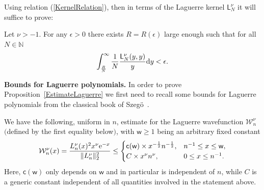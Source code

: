 Using relation (\ref{KernelRelation}), then in terms of the Laguerre kernel $\mathsf{L}_N^{\nu}$ it will suffice to prove:

\begin{Proposition}\label{EstimateLaguerre}
Let $\nu>-1$. For any $\epsilon>0$ there exists $R=R(\epsilon)$ large enough such that for all $N \in \mathbb{N}$
\begin{gather*}
\int_{\frac{R}{N}}^{\infty}\frac{1}{N}\frac{\mathsf{L}_N^{\nu}(y,y)}{y}{\rm d}y<\epsilon.
\end{gather*}
\end{Proposition}

{\bf Bounds for Laguerre polynomials.} In order to prove Proposition~\ref{EstimateLaguerre} we first need to recall some bounds for Laguerre polynomials from the classical book of Szeg\"{o}~\cite{Szego}.

\begin{Lemma}\label{wavefunctionestimate}We have the following, uniform in $n$, estimate for the Laguerre wavefunction $\mathcal{W}_n^{\nu}$ $($defined by the first equality below$)$, with $\mathsf{w}\ge 1$ being an arbitrary fixed constant
\begin{gather*}%
\mathcal{W}_{n}^{\nu}(x)=\frac{L_n^{\nu}(x)^2x^{\nu}{\rm e}^{-x}}{\|L_n^{\nu}\|_2^2}\le \begin{cases}
\mathsf{c}(\mathsf{w})\times x^{-\frac{1}{2}}n^{-\frac{1}{2}}, & n^{-1}\le x \le \mathsf{w},\\
C\times x^\nu n^{\nu}, & 0 \le x \le n^{-1}.
\end{cases}
\end{gather*}
Here, $\mathsf{c}(\mathsf{w})$ only depends on $\mathsf{w}$ and in particular is independent of $n$, while $C$ is a generic constant independent of all quantities involved in the statement above.
\end{Lemma}

